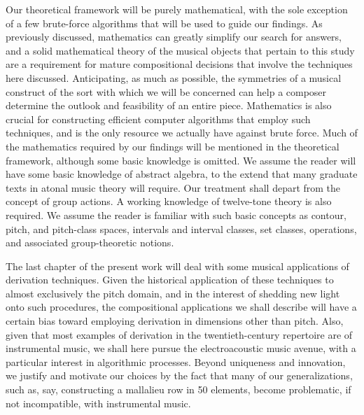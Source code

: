 Our theoretical framework will be purely mathematical, with the sole exception of a few brute-force algorithms that will be used to guide our findings. As previously discussed, mathematics can greatly simplify our search for answers, and a solid mathematical theory of the musical objects that pertain to this study are a requirement for mature compositional decisions that involve the techniques here discussed. Anticipating, as much as possible, the symmetries of a musical construct of the sort with which we will be concerned can help a composer determine the outlook and feasibility of an entire piece. Mathematics is also crucial for constructing efficient computer algorithms that employ such techniques, and is the only resource we actually have against brute force. Much of the mathematics required by our findings will be mentioned in the theoretical framework, although some basic knowledge is omitted. We assume the reader will have some basic knowledge of abstract algebra, to the extend that many graduate texts in atonal music theory will require. Our treatment shall depart from the concept of group actions. A working knowledge of twelve-tone theory is also required. We assume the reader is familiar with such basic concepts as contour, pitch, and pitch-class spaces, intervals and interval classes, set classes, operations, and associated group-theoretic notions.

The last chapter of the present work will deal with some musical applications of derivation techniques. Given the historical application of these techniques to almost exclusively the pitch domain, and in the interest of shedding new light onto such procedures, the compositional applications we shall describe will have a certain bias toward employing derivation in dimensions other than pitch. Also, given that most examples of derivation in the twentieth-century repertoire are of instrumental music, we shall here pursue the electroacoustic music avenue, with a particular interest in algorithmic processes. Beyond uniqueness and innovation, we justify and motivate our choices by the fact that many of our generalizations, such as, say, constructing a mallalieu row in 50 elements, become problematic, if not incompatible, with instrumental music.

